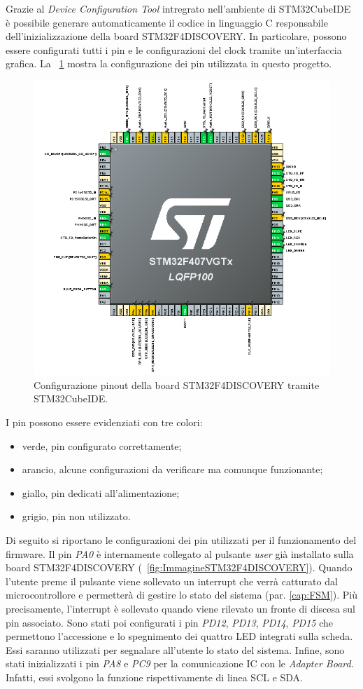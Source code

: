 Grazie al \textit{Device Configuration Tool} intregrato nell'ambiente di STM32CubeIDE è possibile generare automaticamente il codice in linguaggio C responsabile dell'inizializzazione della board STM32F4DISCOVERY. In particolare, possono essere configurati tutti i pin e le configurazioni del clock tramite un'interfaccia grafica. La \Fig~\ref{fig:Pinout} mostra la configurazione dei pin utilizzata in questo progetto. 
\begin{figure}[tbh]
	\centering
	\includegraphics[width=0.9\linewidth]{ImageFiles/Firmware/Pinout}
	\caption[Configurazione pinout della board STM32F4DISCOVERY]{Configurazione pinout della board STM32F4DISCOVERY tramite STM32CubeIDE.}
	\label{fig:Pinout}
\end{figure}
I pin possono essere evidenziati con tre colori:
\begin{itemize}
	\item verde, pin configurato correttamente;
	\item arancio, alcune configurazioni da verificare ma comunque funzionante;
	\item giallo, pin dedicati all'alimentazione;
	\item grigio, pin non utilizzato.
\end{itemize}
Di seguito si riportano le configurazioni dei pin utilizzati per il funzionamento del firmware. Il pin \textit{PA0} è internamente collegato al pulsante \textit{user} già installato sulla board STM32F4DISCOVERY (\Fig~\ref{fig:ImmagineSTM32F4DISCOVERY}). Quando l'utente preme il pulsante viene sollevato un interrupt che verrà catturato dal microcontrollore e permetterà di gestire lo stato del sistema (par. \ref{cap:FSM}). Più precisamente, l'interrupt è sollevato quando viene rilevato un fronte di discesa sul pin associato. Sono stati poi configurati i pin \textit{PD12}, \textit{PD13}, \textit{PD14}, \textit{PD15} che permettono l'accessione e lo spegnimento dei quattro LED integrati sulla scheda. Essi saranno utilizzati per segnalare all'utente lo stato del sistema. Infine, sono stati inizializzati i pin \textit{PA8} e \textit{PC9} per la comunicazione IC con le \textit{Adapter Board}. Infatti, essi svolgono la funzione rispettivamente di linea SCL e SDA.
